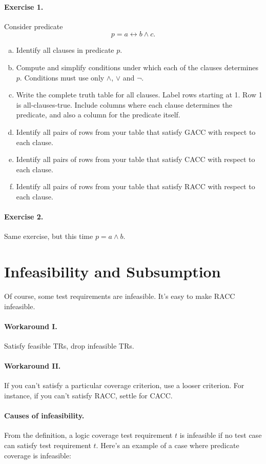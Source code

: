 \documentclass[11pt]{article}
\begin{document}
\paragraph{Exercise 1.} Consider predicate
\[ p = a \leftrightarrow b \wedge c.\]
\begin{enumerate}[(a)]
\item Identify all clauses in predicate $p$.
\item Compute and simplify conditions under which each of the clauses determines $p$.
  Conditions must use only $\wedge$, $\vee$ and $\neg$.
\item Write the complete truth table for all clauses. Label rows starting at 1.
  Row 1 is all-clauses-true. Include columns where each clause determines the
  predicate, and also a column for the predicate itself.
\item Identify all pairs of rows from your table that satisfy GACC with respect
  to each clause.
\item Identify all pairs of rows from your table that satisfy CACC with respect
  to each clause.
\item Identify all pairs of rows from your table that satisfy RACC with respect
  to each clause.
\end{enumerate}
\paragraph{Exercise 2.} Same exercise, but this time $p = a \wedge b$.

\section*{Infeasibility and Subsumption}
Of course, some test requirements are infeasible. It's easy to make RACC infeasible.

\paragraph{Workaround I.} Satisfy feasible TRs, drop infeasible TRs.

\paragraph{Workaround II.} If you can't satisfy a particular
coverage criterion, use a looser criterion. For instance, if you can't satisfy
RACC, settle for CACC.

\paragraph{Causes of infeasibility.} From the
definition, a logic coverage test requirement $t$ is infeasible if
no test case can satisfy test requirement $t$. Here's an example of
a case where predicate coverage is infeasible:
\end{document}
